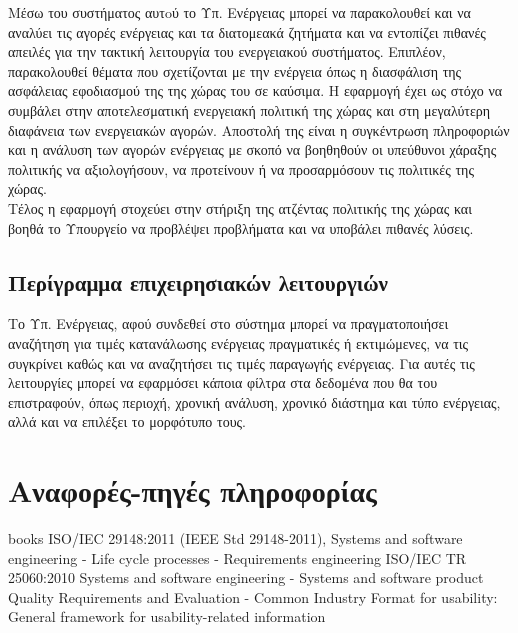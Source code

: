 \documentclass[a4paper,12pt, oneside]{article}
\begin{document}
Μέσω του συστήματος αυτoύ το Υπ. Ενέργειας μπορεί να παρακολουθεί και να αναλύει τις αγορές ενέργειας και τα διατομεακά ζητήματα και να εντοπίζει πιθανές απειλές για την τακτική λειτουργία του ενεργειακού συστήματος. Επιπλέον, παρακολουθεί θέματα που σχετίζονται με την ενέργεια όπως η διασφάλιση της ασφάλειας εφοδιασμού της της χώρας του σε καύσιμα. Η εφαρμογή έχει ως στόχο να συμβάλει στην αποτελεσματική ενεργειακή πολιτική της χώρας και στη μεγαλύτερη διαφάνεια των ενεργειακών αγορών. Αποστολή της είναι η συγκέντρωση πληροφοριών και η ανάλυση των αγορών ενέργειας με σκοπό να βοηθηθούν οι υπεύθυνοι χάραξης πολιτικής να αξιολογήσουν, να προτείνουν ή να προσαρμόσουν τις πολιτικές της χώρας. \\Τέλος η εφαρμογή στοχεύει στην στήριξη της ατζέντας πολιτικής της χώρας και βοηθά το Υπουργείο να προβλέψει προβλήματα και να υποβάλει πιθανές λύσεις.


\subsection{Περίγραμμα επιχειρησιακών λειτουργιών}
Το Υπ. Ενέργειας, αφού συνδεθεί στο σύστημα μπορεί να πραγματοποιήσει αναζήτηση για τιμές κατανάλωσης ενέργειας πραγματικές ή εκτιμώμενες, να τις συγκρίνει καθώς και να αναζητήσει τις τιμές παραγωγής ενέργειας. Για αυτές τις λειτουργίες μπορεί να εφαρμόσει κάποια φίλτρα στα δεδομένα που θα του επιστραφούν, όπως περιοχή, χρονική ανάλυση, χρονικό διάστημα και τύπο ενέργειας, αλλά και να  επιλέξει το μορφότυπο τους.

\newpage
\section{Αναφορές-πηγές πληροφορίας}
\begingroup
\renewcommand{\section}{\subsection}
\begin{thebibliography} {books}
\latintext
{} ISO/IEC 29148:2011 (IEEE Std 29148-2011), Systems and software engineering - Life cycle processes - Requirements engineering
 ISO/IEC TR 25060:2010  Systems and software engineering - Systems and software product Quality Requirements and Evaluation - Common Industry Format for usability: General framework for usability-related information
\end{thebibliography}
\endgroup
\end{document}
